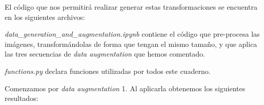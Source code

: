 El código que nos permitirá realizar generar estas transformaciones se encuentra en los siguientes archivos:

\vspace{0.2cm}

\noindent \textit{{data\_generation\_and\_augmentation.ipynb}} contiene el código que pre-procesa las imágenes, transformándolas de forma que tengan el mismo tamaño, y que aplica las tres secuencias de \textit{data augmentation} que hemos comentado.

\noindent \textit{functions.py} declara funciones utilizadas por todos este cuaderno.

Comenzamos por \textit{data augmentation} 1. Al aplicarla obtenemos los siguientes resultados:

